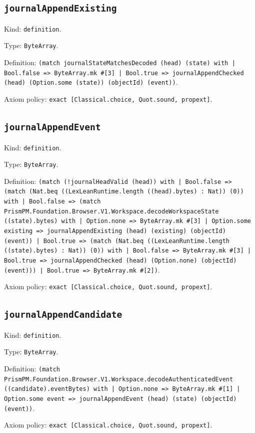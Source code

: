 \documentclass[11pt]{article}
\begin{document}
\subsection*{\texttt{journalAppendExisting}}
\noindent Kind: \texttt{definition}.\par
\noindent Type: \texttt{ByteArray}.\par
\noindent Definition: \texttt{(match journalStateMatchesDecoded (head) (state) with | Bool.false => ByteArray.mk \#[3] | Bool.true => journalAppendChecked (head) (Option.some (state)) (objectId) (event))}.\par
\noindent Axiom policy: \texttt{exact [Classical.choice, Quot.sound, propext]}.\par
\subsection*{\texttt{journalAppendEvent}}
\noindent Kind: \texttt{definition}.\par
\noindent Type: \texttt{ByteArray}.\par
\noindent Definition: \texttt{(match (!journalHeadValid (head)) with | Bool.false => (match (Nat.beq ((LexLeanRuntime.length ((head).bytes) : Nat)) (0)) with | Bool.false => (match PrismPM.Foundation.Browser.V1.Workspace.decodeWorkspaceState ((state).bytes) with | Option.none => ByteArray.mk \#[3] | Option.some existing => journalAppendExisting (head) (existing) (objectId) (event)) | Bool.true => (match (Nat.beq ((LexLeanRuntime.length ((state).bytes) : Nat)) (0)) with | Bool.false => ByteArray.mk \#[3] | Bool.true => journalAppendChecked (head) (Option.none) (objectId) (event))) | Bool.true => ByteArray.mk \#[2])}.\par
\noindent Axiom policy: \texttt{exact [Classical.choice, Quot.sound, propext]}.\par
\subsection*{\texttt{journalAppendCandidate}}
\noindent Kind: \texttt{definition}.\par
\noindent Type: \texttt{ByteArray}.\par
\noindent Definition: \texttt{(match PrismPM.Foundation.Browser.V1.Workspace.decodeAuthenticatedEvent ((candidate).eventBytes) with | Option.none => ByteArray.mk \#[1] | Option.some event => journalAppendEvent (head) (state) (objectId) (event))}.\par
\noindent Axiom policy: \texttt{exact [Classical.choice, Quot.sound, propext]}.\par
\end{document}
